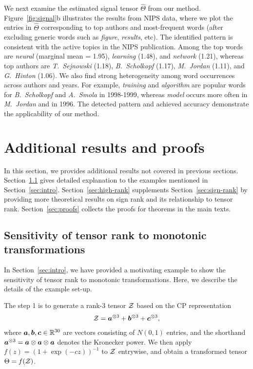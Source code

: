 \documentclass[11pt]{article}
\theoremstyle{plain}
\theoremstyle{definition}
\begin{document}
We next examine the estimated signal tensor $\hat \Theta$ from our method.  Figure~\ref{fig:signal}b illustrates the results from NIPS data, where we plot the entries in $\hat \Theta$ corresponding to top authors and most-frequent words (after excluding generic words such as \emph{figure}, \emph{results}, etc). The identified pattern is consistent with the active topics in the NIPS publication. Among the top words are \emph{neural} (marginal mean = 1.95), \emph{learning} (1.48), and \emph{network} (1.21), whereas top authors are \emph{T.\ Sejnowski} (1.18), \emph{B.~Scholkopf} (1.17), \emph{M.\ Jordan} (1.11), and \emph{G.\ Hinton} (1.06). We also find strong heterogeneity among word occurrences across authors and years. For example, \emph{training} and \emph{algorithm} are popular words for \emph{B.\ Scholkopf} and \emph{A.\ Smola} in 1998-1999, whereas \emph{model} occurs more often in \emph{M.\ Jordan} and in 1996. The detected pattern and achieved accuracy demonstrate the applicability of our method.



\section{Additional results and proofs}
In this section, we provides additional results not covered in previous sections. Section~\ref{sec:additional} gives detailed explanation to the examples mentioned in Section~\ref{sec:intro}. Section~\ref{sec:high-rank} supplements Section~\ref{sec:sign-rank} by providing more theoretical results on sign rank and its relationship to tensor rank. Section~\ref{sec:proofs} collects the proofs for theorems in the main texts. 


\subsection{Sensitivity of tensor rank to monotonic transformations}\label{sec:additional}
In Section~\ref{sec:intro}, we have provided a motivating example to show the sensitivity of tensor rank to monotonic transformations. Here, we describe the details of the example set-up. 

The step 1 is to generate a rank-3 tensor $\mathcal{Z}$ based on the CP representation
\[
\mathcal{Z}=\bm{a}^{\otimes 3}+\bm{b}^{\otimes 3}+\bm{c}^{\otimes 3},
\]
where $\bm{a},\bm{b},\bm{c}\in\mathbb{R}^{30}$ are vectors consisting of $N(0,1)$ entries, and the shorthand $\bm{a}^{\otimes 3}=\bm{a}\otimes \bm{a}\otimes \bm{a}$ denotes the Kronecker power. We then apply $f(z)=(1+\exp(-cz))^{-1}$ to $\mathcal{Z}$ entrywise, and obtain a transformed tensor $\Theta=f(\mathcal{Z})$. 
\end{document}

